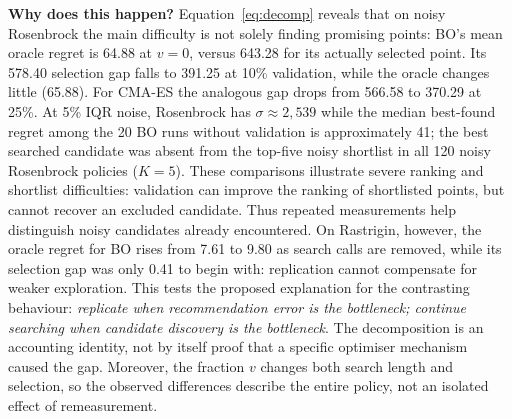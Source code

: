 \documentclass[11pt,a4paper]{article}
\begin{document}
\textbf{Why does this happen?} Equation~\eqref{eq:decomp} reveals that on noisy Rosenbrock the main difficulty is not solely finding promising points: BO's mean oracle regret is 64.88 at $v=0$, versus 643.28 for its actually selected point. Its 578.40 selection gap falls to 391.25 at 10\% validation, while the oracle changes little (65.88). For CMA-ES the analogous gap drops from 566.58 to 370.29 at 25\%. At 5\% IQR noise, Rosenbrock has $\sigma\approx2{,}539$ while the median best-found regret among the 20 BO runs without validation is approximately 41; the best searched candidate was absent from the top-five noisy shortlist in all 120 noisy Rosenbrock policies ($K=5$). These comparisons illustrate severe ranking and shortlist difficulties: validation can improve the ranking of shortlisted points, but cannot recover an excluded candidate. Thus repeated measurements help distinguish noisy candidates already encountered. On Rastrigin, however, the oracle regret for BO rises from 7.61 to 9.80 as search calls are removed, while its selection gap was only 0.41 to begin with: replication cannot compensate for weaker exploration. This tests the proposed explanation for the contrasting behaviour: \emph{replicate when recommendation error is the bottleneck; continue searching when candidate discovery is the bottleneck}. The decomposition is an accounting identity, not by itself proof that a specific optimiser mechanism caused the gap. Moreover, the fraction $v$ changes both search length and selection, so the observed differences describe the entire policy, not an isolated effect of remeasurement.
\end{document}
